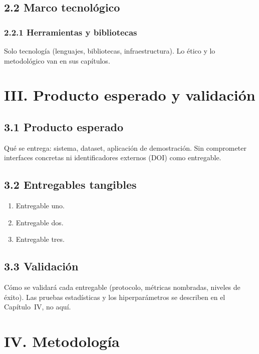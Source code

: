 \documentclass[12pt,letterpaper]{report}
\begin{document}
\section{2.2 Marco tecnológico}

\subsection{2.2.1 Herramientas y bibliotecas}

Solo tecnología (lenguajes, bibliotecas, infraestructura). Lo ético y lo metodológico van en sus capítulos.

\chapter{III. Producto esperado y validación}

\section{3.1 Producto esperado}

Qué se entrega: sistema, dataset, aplicación de demostración. Sin comprometer interfaces concretas ni identificadores externos (DOI) como entregable.

\section{3.2 Entregables tangibles}

\begin{enumerate}[label=\textbf{E\arabic*.}, leftmargin=1.2cm]
    \item Entregable uno.
    \item Entregable dos.
    \item Entregable tres.
\end{enumerate}

\section{3.3 Validación}

Cómo se validará cada entregable (protocolo, métricas nombradas, niveles de éxito). Las pruebas estadísticas y los hiperparámetros se describen en el Capítulo~IV, no aquí.

\chapter{IV. Metodología}
\end{document}
